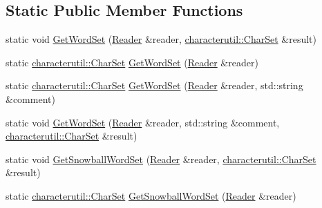 \subsection*{Static Public Member Functions}
\begin{DoxyCompactItemize}
\item 
static void \mbox{\hyperlink{classlucene_1_1core_1_1analysis_1_1WordlistLoader_a24b538126a425f139dcec46732bf247c}{Get\+Word\+Set}} (\mbox{\hyperlink{classlucene_1_1core_1_1analysis_1_1Reader}{Reader}} \&reader, \mbox{\hyperlink{classlucene_1_1core_1_1analysis_1_1characterutil_1_1CharSet}{characterutil\+::\+Char\+Set}} \&result)
\item 
static \mbox{\hyperlink{classlucene_1_1core_1_1analysis_1_1characterutil_1_1CharSet}{characterutil\+::\+Char\+Set}} \mbox{\hyperlink{classlucene_1_1core_1_1analysis_1_1WordlistLoader_a73702896dacde3a217abb59460cc197a}{Get\+Word\+Set}} (\mbox{\hyperlink{classlucene_1_1core_1_1analysis_1_1Reader}{Reader}} \&reader)
\item 
static \mbox{\hyperlink{classlucene_1_1core_1_1analysis_1_1characterutil_1_1CharSet}{characterutil\+::\+Char\+Set}} \mbox{\hyperlink{classlucene_1_1core_1_1analysis_1_1WordlistLoader_af3b4eb90930c09d25d772c760ecf9278}{Get\+Word\+Set}} (\mbox{\hyperlink{classlucene_1_1core_1_1analysis_1_1Reader}{Reader}} \&reader, std\+::string \&comment)
\item 
static void \mbox{\hyperlink{classlucene_1_1core_1_1analysis_1_1WordlistLoader_a93e88980df89ba7a5574a5dbeabfd502}{Get\+Word\+Set}} (\mbox{\hyperlink{classlucene_1_1core_1_1analysis_1_1Reader}{Reader}} \&reader, std\+::string \&comment, \mbox{\hyperlink{classlucene_1_1core_1_1analysis_1_1characterutil_1_1CharSet}{characterutil\+::\+Char\+Set}} \&result)
\item 
static void \mbox{\hyperlink{classlucene_1_1core_1_1analysis_1_1WordlistLoader_a38f6cafbcbe8a4a375f2e5a7eb83aaf5}{Get\+Snowball\+Word\+Set}} (\mbox{\hyperlink{classlucene_1_1core_1_1analysis_1_1Reader}{Reader}} \&reader, \mbox{\hyperlink{classlucene_1_1core_1_1analysis_1_1characterutil_1_1CharSet}{characterutil\+::\+Char\+Set}} \&result)
\item 
static \mbox{\hyperlink{classlucene_1_1core_1_1analysis_1_1characterutil_1_1CharSet}{characterutil\+::\+Char\+Set}} \mbox{\hyperlink{classlucene_1_1core_1_1analysis_1_1WordlistLoader_a3da7c25daa42514be8157b894a3e58df}{Get\+Snowball\+Word\+Set}} (\mbox{\hyperlink{classlucene_1_1core_1_1analysis_1_1Reader}{Reader}} \&reader)
\item 

\end{DoxyCompactItemize}
